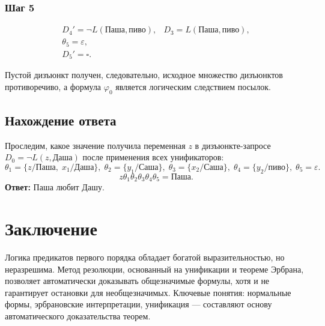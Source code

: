 \documentclass[10pt]{article}
\begin{document}
\subsubsection*{Шаг 5}
\[
\begin{array}{ll}
D_4' = \neg L(\text{Паша}, \text{пиво}), & D_3 = L(\text{Паша}, \text{пиво}), \\
\theta_5 = \varepsilon, & \\
D_5' = \square. &
\end{array}
\]

Пустой дизъюнкт получен, следовательно, исходное множество дизъюнктов противоречиво, а формула $\varphi_0$ является логическим следствием посылок.

\subsection*{Нахождение ответа}
Проследим, какое значение получила переменная $z$ в дизъюнкте-запросе $D_0 = \neg L(z, \text{Даша})$ после применения всех унификаторов:
\[
\theta_1 = \{z/\text{Паша},\; x_1/\text{Даша}\},\;
\theta_2 = \{y_1/\text{Саша}\},\;
\theta_3 = \{x_2/\text{Саша}\},\;
\theta_4 = \{y_2/\text{пиво}\},\;
\theta_5 = \varepsilon.
\]
\[
z\theta_1\theta_2\theta_3\theta_4\theta_5 = \text{Паша}.
\]
\textbf{Ответ:} Паша любит Дашу.

\section*{Заключение}
Логика предикатов первого порядка обладает богатой выразительностью, но неразрешима. Метод резолюции, основанный на унификации и теореме Эрбрана, позволяет автоматически доказывать общезначимые формулы, хотя и не гарантирует остановки для необщезначимых. Ключевые понятия: нормальные формы, эрбрановские интерпретации, унификация — составляют основу автоматического доказательства теорем.
\end{document}

